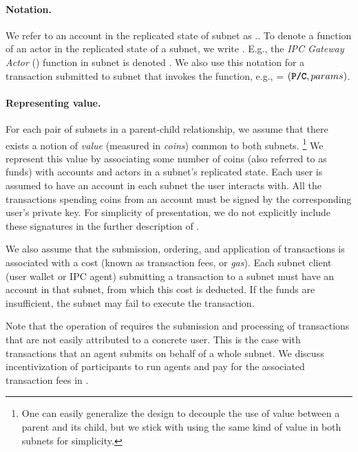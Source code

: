 \paragraph{Notation.} We refer to an account  in the replicated state of subnet  as ..
To denote a function of an actor in the replicated state of a subnet, we write .
E.g., the \emph{IPC Gateway Actor} (\gw) function  in subnet  is denoted .
We also use this notation for a transaction  submitted to subnet  that invokes the function, e.g.,  = $(\textbf{\texttt{P/C}}, params)$.

\paragraph{Representing value.}
For each pair of subnets in a parent-child relationship, we assume that there exists a notion of \emph{value} (measured in \emph{coins}) common to both subnets.%
\footnote{One can easily generalize the design to decouple the use of value between a parent and its child, but we stick with using the same kind of value in both subnets for simplicity.}
We represent this value by associating some number of coins (also referred to as funds) with accounts and actors in a subnet's replicated state.
Each user is assumed to have an account in each subnet the user interacts with.
All the transactions spending coins from an account must be signed by the corresponding user's private key.
For simplicity of presentation, we do not explicitly include these signatures in the further description of \ipc.

We also assume that the submission, ordering, and application of transactions is associated with a cost (known as transaction fees, or \emph{gas}).
Each subnet client (user wallet or IPC agent) submitting a transaction to a subnet must have an account in that subnet, from which this cost is deducted.
If the funds are insufficient, the subnet may fail to execute the transaction.

Note that the operation of \ipc requires the submission and processing of transactions that are not easily attributed to a concrete user.
This is the case with transactions that an \ipc agent submits on behalf of a whole subnet.
We discuss incentivization of participants to run \ipc agents and pay for the associated transaction fees in .

